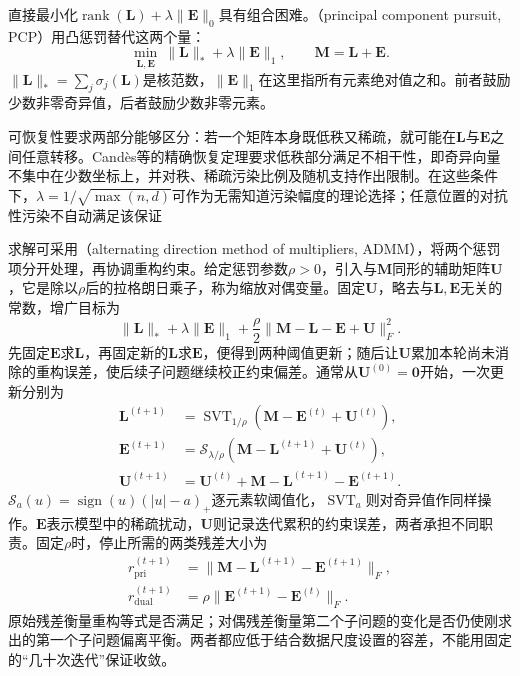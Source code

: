 直接最小化$\operatorname{rank}(\bm{L})+\lambda\lVert\bm{E}\rVert_0$具有组合困难。（principal component pursuit, PCP）用凸惩罚替代这两个量：
\begin{equation}
  \min_{\bm{L},\bm{E}}\
     \lVert\bm{L}\rVert_*+\lambda\lVert\bm{E}\rVert_1,
  \qquad \bm{M}=\bm{L}+\bm{E}.
  \label{eq:dim-pcp}
\end{equation}
$\lVert\bm{L}\rVert_*=\sum_j\sigma_j(\bm{L})$是核范数，$\lVert\bm{E}\rVert_1$在这里指所有元素绝对值之和。前者鼓励少数非零奇异值，后者鼓励少数非零元素。

可恢复性要求两部分能够区分：若一个矩阵本身既低秩又稀疏，就可能在$\bm{L}$与$\bm{E}$之间任意转移。Candès等的精确恢复定理要求低秩部分满足不相干性，即奇异向量不集中在少数坐标上，并对秩、稀疏污染比例及随机支持作出限制。在这些条件下，$\lambda=1/\sqrt{\max(n,d)}$可作为无需知道污染幅度的理论选择；任意位置的对抗性污染不自动满足该保证

求解可采用（alternating direction method of multipliers, ADMM），将两个惩罚项分开处理，再协调重构约束。给定惩罚参数$\rho>0$，引入与$\bm{M}$同形的辅助矩阵$\bm{U}$，它是除以$\rho$后的拉格朗日乘子，称为缩放对偶变量。固定$\bm{U}$，略去与$\bm{L},\bm{E}$无关的常数，增广目标为
\[
  \lVert\bm{L}\rVert_*+\lambda\lVert\bm{E}\rVert_1
  +\frac{\rho}{2}
   \lVert\bm{M}-\bm{L}-\bm{E}+\bm{U}\rVert_F^2.
\]
先固定$\bm{E}$求$\bm{L}$，再固定新的$\bm{L}$求$\bm{E}$，便得到两种阈值更新；随后让$\bm{U}$累加本轮尚未消除的重构误差，使后续子问题继续校正约束偏差。通常从$\bm{U}^{(0)}=\bm{0}$开始，一次更新分别为
\begin{equation}
  \begin{aligned}
  \bm{L}^{(t+1)}&=\operatorname{SVT}_{1/\rho}
                  (\bm{M}-\bm{E}^{(t)}+\bm{U}^{(t)}),\\
  \bm{E}^{(t+1)}&=\mathcal{S}_{\lambda/\rho}
                  (\bm{M}-\bm{L}^{(t+1)}+\bm{U}^{(t)}),\\
  \bm{U}^{(t+1)}&=\bm{U}^{(t)}
                   +\bm{M}-\bm{L}^{(t+1)}-\bm{E}^{(t+1)}.
  \end{aligned}
  \label{eq:dim-rpca-admm}
\end{equation}
$\mathcal{S}_{a}(u)=\operatorname{sign}(u)(|u|-a)_+$逐元素软阈值化，$\operatorname{SVT}_{a}$则对奇异值作同样操作。$\bm{E}$表示模型中的稀疏扰动，$\bm{U}$则记录迭代累积的约束误差，两者承担不同职责。固定$\rho$时，停止所需的两类残差大小为
\[
  \begin{aligned}
    r_{\mathrm{pri}}^{(t+1)}
      &=\lVert\bm{M}-\bm{L}^{(t+1)}-\bm{E}^{(t+1)}\rVert_F,\\
    r_{\mathrm{dual}}^{(t+1)}
      &=\rho\lVert\bm{E}^{(t+1)}-\bm{E}^{(t)}\rVert_F.
  \end{aligned}
\]
原始残差衡量重构等式是否满足；对偶残差衡量第二个子问题的变化是否仍使刚求出的第一个子问题偏离平衡。两者都应低于结合数据尺度设置的容差，不能用固定的“几十次迭代”保证收敛。

